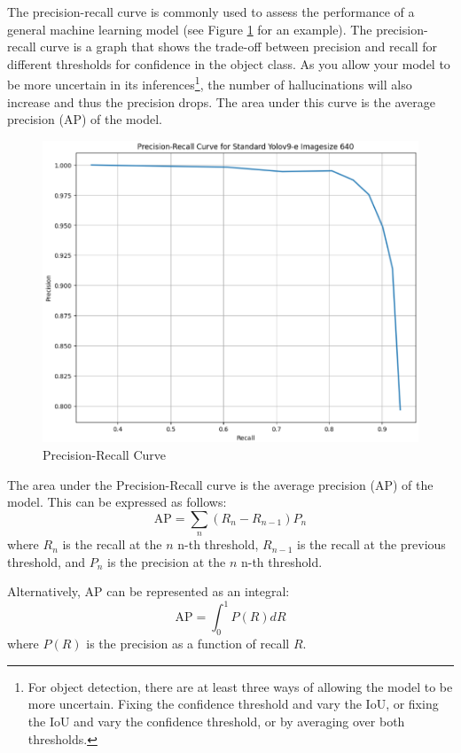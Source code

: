 The precision-recall curve is commonly used to assess the performance of a general machine learning model (see Figure \ref{fig:precisionrecallcurveexample} for an example). The precision-recall curve is a graph that shows the trade-off between precision and recall for different thresholds for confidence in the object class. As you allow your model to be more uncertain in its inferences\footnote{For object detection, there are at least three ways of allowing the model to be more uncertain. Fixing the confidence threshold and vary the IoU, or fixing the IoU and vary the confidence threshold, or by averaging over both thresholds.}, the number of hallucinations will also increase and thus the precision drops. The area under this curve is the average precision (AP) of the model.

\begin{figure}[H]
    \centering
    \includegraphics[width=0.7\linewidth]{Images/Results/PR-curve standard e 640.png}
    \caption{\centering Precision-Recall Curve}
    \label{fig:precisionrecallcurveexample}
\end{figure}

The area under the Precision-Recall curve is the average precision (AP) of the model. This can be expressed as follows:
\begin{equation}
    \text{AP} = \sum_{n} (R_n - R_{n-1}) P_n
\end{equation}
where $R_n$ is the recall at the $n$ n-th threshold, $R_{n-1}$ is the recall at the previous threshold, and $P_n$ is the precision at the $n$ n-th threshold.

Alternatively, AP can be represented as an integral:
\begin{equation}
    \text{AP} = \int_{0}^{1} P(R) dR
\end{equation}
where $P(R)$ is the precision as a function of recall $R$.


